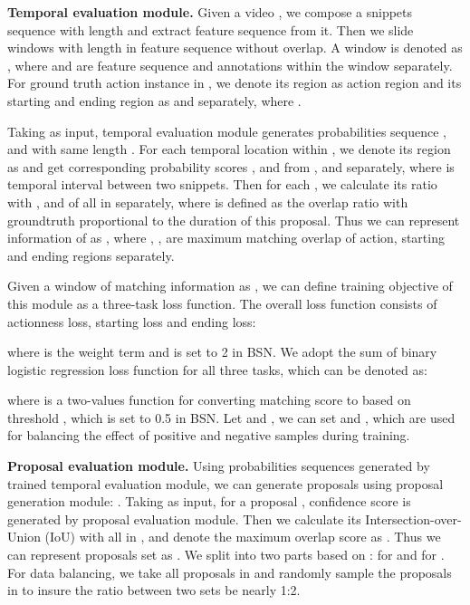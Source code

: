 \documentclass[runningheads]{llncs}
\begin{document}
\noindent
{\bf Temporal evaluation module.}
Given a video , we compose a snippets sequence  with length  and extract feature sequence  from it. 
Then we slide windows with length  in feature sequence without overlap.
A window is denoted as , where  and  are feature sequence and annotations within the window separately. 
 For ground truth action instance  in  , we denote its region as action region  and its starting and ending region as  and  separately, where .

Taking  as input, temporal evaluation module generates probabilities sequence ,  and  with same length . 
For each temporal location  within , we denote its region as  and get corresponding probability scores ,  and  from ,  and  separately, where  is temporal interval between two snippets. 
Then for each  , we calculate its  ratio with ,  and  of all  in  separately, where  is defined as the overlap ratio with groundtruth proportional to the duration of this proposal. Thus we can represent information of  as , where , ,  are maximum matching overlap  of action, starting and ending regions separately.


Given a window of matching information as , we can define training objective of this module as a three-task loss function. The overall loss function consists of actionness loss, starting loss and ending loss:



where  is the weight term and is set to 2 in BSN. We adopt the sum of binary logistic regression loss function  for all three tasks, which can be denoted as:

\begin{small}

\end{small}
where  is a two-values function for converting matching score  to  based on threshold , which is set to 0.5 in BSN.  Let  and , we can set  and , which are used for balancing the effect of positive and negative samples during training.


\noindent
{\bf Proposal evaluation module.}
Using probabilities sequences generated by trained temporal evaluation module, we can generate proposals using proposal generation module: . Taking  as input, for a proposal ,  confidence score  is generated by proposal evaluation module. Then we calculate its Intersection-over-Union (IoU)  with all  in , and denote the maximum overlap score as . Thus we can represent proposals set as .
We split  into two parts based on :  for  and   for . For data balancing, we take all proposals in  and randomly sample the proposals in  to insure the ratio between two sets be nearly 1:2.
\end{document}
